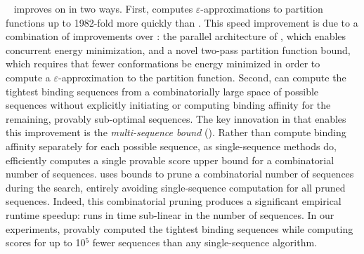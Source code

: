\bbks~\cite{BBK*} improves on \ks in two ways. First, \bbks computes $\varepsilon$-approximations to partition functions up to 1982-fold more quickly than \ks. This speed improvement is due to a combination of improvements over \ks: the parallel architecture of \bbks, which enables concurrent energy minimization, and a novel two-pass partition function bound, which requires that fewer conformations be energy minimized in order to compute a $\varepsilon$-approximation to the partition function. Second, \bbks can compute the tightest binding sequences from a combinatorially large space of possible sequences without explicitly initiating or computing binding affinity for the remaining, provably sub-optimal sequences. The key innovation in \bbks that enables this improvement is the \emph{multi-sequence bound} (\msbound). Rather than compute binding affinity separately for each possible sequence, as single-sequence methods do, \bbks efficiently computes a single provable \ks score upper bound for a combinatorial number of sequences. \bbks uses \msbound bounds to prune a combinatorial number of sequences during the search, entirely avoiding single-sequence computation for all pruned sequences. Indeed, this combinatorial pruning produces a significant empirical runtime speedup: \bbks runs in time sub-linear in the number of sequences. In our experiments, \bbks provably computed the tightest binding sequences while computing \ks scores for up to 10$^5$ fewer sequences than any single-sequence algorithm.